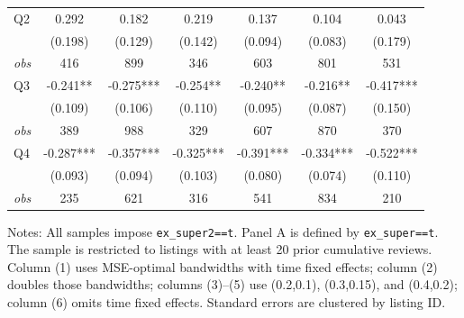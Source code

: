 \begin{table}[!htbp]
\begin{tabular}{lcccccc}
Q2 & 0.292 & 0.182 & 0.219 & 0.137 & 0.104 & 0.043 \\
 & (0.198) & (0.129) & (0.142) & (0.094) & (0.083) & (0.179) \\
\textit{obs} & 416 & 899 & 346 & 603 & 801 & 531 \\
Q3 & -0.241** & -0.275*** & -0.254** & -0.240** & -0.216** & -0.417*** \\
 & (0.109) & (0.106) & (0.110) & (0.095) & (0.087) & (0.150) \\
\textit{obs} & 389 & 988 & 329 & 607 & 870 & 370 \\
Q4 & -0.287*** & -0.357*** & -0.325*** & -0.391*** & -0.334*** & -0.522*** \\
 & (0.093) & (0.094) & (0.103) & (0.080) & (0.074) & (0.110) \\
\textit{obs} & 235 & 621 & 316 & 541 & 834 & 210 \\
\bottomrule
\end{tabular}
\begin{minipage}{0.98\textwidth}\footnotesize
Notes: All samples impose \texttt{ex\_super2==t}. Panel A is defined by \texttt{ex\_super==t}. The sample is restricted to listings with at least 20 prior cumulative reviews. Column (1) uses MSE-optimal bandwidths with time fixed effects; column (2) doubles those bandwidths; columns (3)--(5) use (0.2,0.1), (0.3,0.15), and (0.4,0.2); column (6) omits time fixed effects. Standard errors are clustered by listing ID.
\end{minipage}
\end{table}

